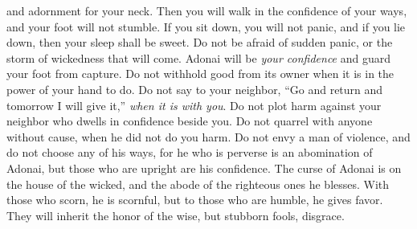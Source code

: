 \begin{biblechapter}
and adornment for your neck.
\verse Then you will walk in the confidence of your ways, 
and your foot will not stumble.
\verse If you sit down, you will not panic, 
and if you lie down, then your sleep shall be sweet.
\verse Do not be afraid of sudden panic, 
or the storm of wickedness that will come.
\verse Adonai will be \textit{your confidence} 
and guard your foot from capture.
\verse Do not withhold good from its owner 
when it is in the power of your hand to do.
\verse Do not say to your neighbor, 
“Go and return and tomorrow I will give it,” 
\textit{when it is with you}.
\verse Do not plot harm against your neighbor 
who dwells in confidence beside you.
\verse Do not quarrel with anyone without cause, 
when he did not do you harm.
\verse Do not envy a man of violence, 
and do not choose any of his ways,
\verse for he who is perverse is an abomination of Adonai, 
but those who are upright are his confidence.
\verse The curse of Adonai is on the house of the wicked, 
and the abode of the righteous ones he blesses.
\verse With those who scorn, he is scornful, 
but to those who are humble, he gives favor.
\verse They will inherit the honor of the wise, 
but stubborn fools, disgrace.
\end{biblechapter}

